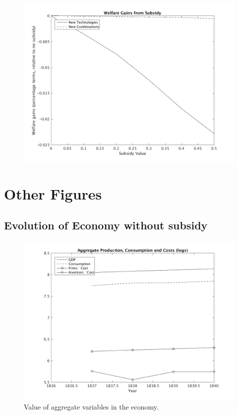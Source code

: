 \documentclass[serif]{article}
\theoremstyle{definition}
\begin{document}
\begin{figure}[h!]
\centering
\includegraphics[width=.8\textwidth]{figures/welfare_gains.png}
\end{figure}

\clearpage

\section*{Other Figures}

\subsection*{Evolution of Economy without subsidy}

\begin{figure}[h!]
\centering
\includegraphics[width=\textwidth]{figures/aggregates.png}
\caption{Value of aggregate variables in the economy.}
\end{figure}
\end{document}
